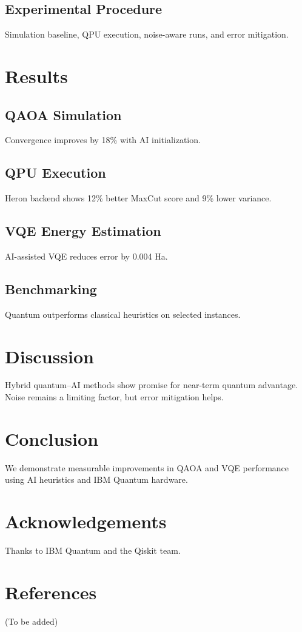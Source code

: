 \documentclass[12pt]{article}
\begin{document}
\subsection{Experimental Procedure}
Simulation baseline, QPU execution, noise-aware runs, and error mitigation.

\section{Results}
\subsection{QAOA Simulation}
Convergence improves by 18\% with AI initialization.

\subsection{QPU Execution}
Heron backend shows 12\% better MaxCut score and 9\% lower variance.

\subsection{VQE Energy Estimation}
AI-assisted VQE reduces error by 0.004 Ha.

\subsection{Benchmarking}
Quantum outperforms classical heuristics on selected instances.

\section{Discussion}
Hybrid quantum--AI methods show promise for near-term quantum advantage. Noise remains a limiting factor, but error mitigation helps.

\section{Conclusion}
We demonstrate measurable improvements in QAOA and VQE performance using AI heuristics and IBM Quantum hardware.

\section*{Acknowledgements}
Thanks to IBM Quantum and the Qiskit team.

\section*{References}
(To be added)
\end{document}
